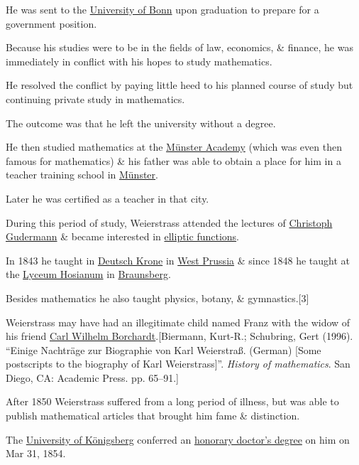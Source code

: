 \documentclass{article}
\begin{document}
He was sent to the \href{https://en.wikipedia.org/wiki/University_of_Bonn}{University of Bonn} upon graduation to prepare for a government position.

Because his studies were to be in the fields of law, economics, \& finance, he was immediately in conflict with his hopes to study mathematics.

He resolved the conflict by paying little heed to his planned course of study but continuing private study in mathematics.

The outcome was that he left the university without a degree.

He then studied mathematics at the \href{https://en.wikipedia.org/wiki/University_of_M%C3%BCnster}{Münster Academy} (which was even then famous for mathematics) \& his father was able to obtain a place for him in a teacher training school in \href{https://en.wikipedia.org/wiki/M%C3%BCnster}{Münster}.

Later he was certified as a teacher in that city.

During this period of study, Weierstrass attended the lectures of \href{https://en.wikipedia.org/wiki/Christoph_Gudermann}{Christoph Gudermann} \& became interested in \href{https://en.wikipedia.org/wiki/Elliptic_function}{elliptic functions}.

%
In 1843 he taught in \href{https://en.wikipedia.org/wiki/Wa%C5%82cz}{Deutsch Krone} in \href{https://en.wikipedia.org/wiki/West_Prussia}{West Prussia} \& since 1848 he taught at the \href{https://en.wikipedia.org/wiki/Collegium_Hosianum}{Lyceum Hosianum} in \href{https://en.wikipedia.org/wiki/Braunsberg}{Braunsberg}.

Besides mathematics he also taught physics, botany, \& gymnastics.[3]

%
Weierstrass may have had an illegitimate child named Franz with the widow of his friend \href{https://en.wikipedia.org/wiki/Carl_Wilhelm_Borchardt}{Carl Wilhelm Borchardt}.[Biermann, Kurt-R.; Schubring, Gert (1996). ``Einige Nachträge zur Biographie von Karl Weierstraß. (German) [Some postscripts to the biography of Karl Weierstrass]''. \textit{History of mathematics}. San Diego, CA: Academic Press. pp. 65--91.]

%
After 1850 Weierstrass suffered from a long period of illness, but was able to publish mathematical articles that brought him fame \& distinction.

The \href{https://en.wikipedia.org/wiki/University_of_K%C3%B6nigsberg}{University of Königsberg} conferred an \href{https://en.wikipedia.org/wiki/Honorary_doctor%27s_degree}{honorary doctor's degree} on him on Mar 31, 1854.
\end{document}
